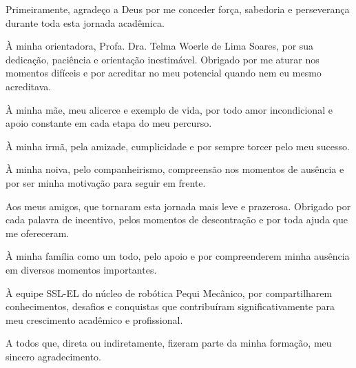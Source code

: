\begin{agradecimentos}
Primeiramente, agradeço a Deus por me conceder força, sabedoria e perseverança durante toda esta jornada acadêmica.

À minha orientadora, Profa. Dra. Telma Woerle de Lima Soares, por sua dedicação, paciência e orientação inestimável. Obrigado por me aturar nos momentos difíceis e por acreditar no meu potencial quando nem eu mesmo acreditava.

À minha mãe, meu alicerce e exemplo de vida, por todo amor incondicional e apoio constante em cada etapa do meu percurso.

À minha irmã, pela amizade, cumplicidade e por sempre torcer pelo meu sucesso.

À minha noiva, pelo companheirismo, compreensão nos momentos de ausência e por ser minha motivação para seguir em frente.

Aos meus amigos, que tornaram esta jornada mais leve e prazerosa. Obrigado por cada palavra de incentivo, pelos momentos de descontração e por toda ajuda que me ofereceram.

À minha família como um todo, pelo apoio e por compreenderem minha ausência em diversos momentos importantes.

À equipe SSL-EL do núcleo de robótica Pequi Mecânico, por compartilharem conhecimentos, desafios e conquistas que contribuíram significativamente para meu crescimento acadêmico e profissional.

A todos que, direta ou indiretamente, fizeram parte da minha formação, meu sincero agradecimento.
\end{agradecimentos}


